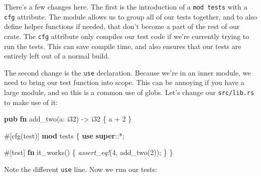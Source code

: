 \documentclass[a4paper,]{book}
\newenvironment{Shaded}{\begin{snugshade}}{\end{snugshade}}
\newcommand{\KeywordTok}[1]{\textcolor[rgb]{0.13,0.29,0.53}{\textbf{{#1}}}}
\newcommand{\DataTypeTok}[1]{\textcolor[rgb]{0.13,0.29,0.53}{{#1}}}
\newcommand{\DecValTok}[1]{\textcolor[rgb]{0.00,0.00,0.81}{{#1}}}
\newcommand{\PreprocessorTok}[1]{\textcolor[rgb]{0.56,0.35,0.01}{\textit{{#1}}}}
\newcommand{\AttributeTok}[1]{\textcolor[rgb]{0.77,0.63,0.00}{{#1}}}
\newcommand{\NormalTok}[1]{{#1}}
\begin{document}
There's a few changes here. The first is the introduction of a
\texttt{mod\ tests} with a \texttt{cfg} attribute. The module allows us
to group all of our tests together, and to also define helper functions
if needed, that don't become a part of the rest of our crate. The
\texttt{cfg} attribute only compiles our test code if we're currently
trying to run the tests. This can save compile time, and also ensures
that our tests are entirely left out of a normal build.

The second change is the \texttt{use} declaration. Because we're in an
inner module, we need to bring our test function into scope. This can be
annoying if you have a large module, and so this is a common use of
globs. Let's change our \texttt{src/lib.rs} to make use of it:

\begin{Shaded}
\begin{Highlighting}[]
\KeywordTok{pub} \KeywordTok{fn} \NormalTok{add_two(a: }\DataTypeTok{i32}\NormalTok{) -> }\DataTypeTok{i32} \NormalTok{\{}
    \NormalTok{a + }\DecValTok{2}
\NormalTok{\}}

\AttributeTok{#[}\NormalTok{cfg}\AttributeTok{(}\NormalTok{test}\AttributeTok{)]}
\KeywordTok{mod} \NormalTok{tests \{}
    \KeywordTok{use} \KeywordTok{super}\NormalTok{::*;}

    \AttributeTok{#[}\NormalTok{test}\AttributeTok{]}
    \KeywordTok{fn} \NormalTok{it_works() \{}
        \PreprocessorTok{assert_eq!}\NormalTok{(}\DecValTok{4}\NormalTok{, add_two(}\DecValTok{2}\NormalTok{));}
    \NormalTok{\}}
\NormalTok{\}}
\end{Highlighting}
\end{Shaded}

Note the different \texttt{use} line. Now we run our tests:

\begin{Shaded}
\end{Shaded}
\end{document}
